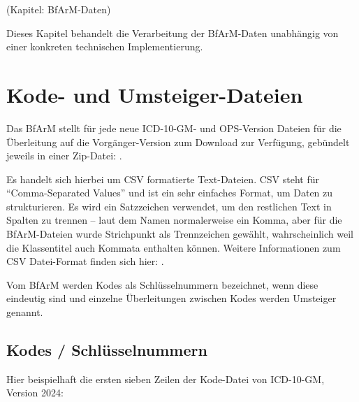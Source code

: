 \newcommand{\codeBoxDouble}[3]{
\begin{tcolorbox}[center,width=#1\textwidth,
    colback=white,colframe=black,boxrule=.5pt]
\texttt{#2}
\tcblower
\texttt{#3}
\end{tcolorbox}
}




(Kapitel: BfArM-Daten)

Dieses Kapitel behandelt die Verarbeitung der BfArM-Daten unabhängig von einer konkreten technischen Implementierung. 

\section{Kode- und Umsteiger-Dateien}

Das BfArM stellt für jede neue ICD-10-GM- und OPS-Version Dateien für die Überleitung auf die Vorgänger-Version zum Download zur Verfügung, gebündelt jeweils in einer Zip-Datei: \citep[Downloads]{bfarmdl}.

Es handelt sich hierbei um CSV formatierte Text-Dateien. CSV steht für ``Comma-Separated Values'' und ist ein sehr einfaches Format, um Daten zu strukturieren. Es wird ein Satzzeichen verwendet, um den restlichen Text in Spalten zu trennen -- laut dem Namen normalerweise ein Komma, aber für die BfArM-Dateien wurde Strichpunkt als Trennzeichen gewählt, wahrscheinlich weil die Klassentitel auch Kommata enthalten können. Weitere Informationen zum CSV Datei-Format finden sich hier: \citep[Seite 131f]{bonnefoy2024definitive}. 

Vom BfArM werden Kodes als Schlüsselnummern bezeichnet, wenn diese eindeutig sind und einzelne Überleitungen zwischen Kodes werden Umsteiger genannt.

\subsection{Kodes / Schlüsselnummern}

Hier beispielhaft die ersten sieben Zeilen der Kode-Datei von ICD-10-GM, Version 2024:


